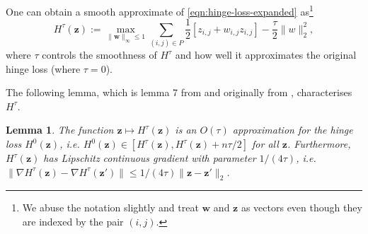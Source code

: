 \documentclass[a4paper, 11pt]{article}
\newtheorem{lemma}{Lemma}
\begin{document}
One can obtain a smooth approximate of \eqref{eqn:hinge-loss-expanded}
as\footnote{We abuse the notation slightly and treat $\bm{w}$ and $\bm{z}$ as
    vectors even though they are indexed by the pair $(i, j)$.}
\begin{equation}
    H^\tau(\bm{z}) := \max_{\lVert \bm{w} \rVert_\infty \le 1} \sum_{(i,j) \in P} \frac12 [z_{i,j} + w_{i,j} z_{i,j}] - \frac{\tau}{2} \lVert w \rVert_2^2,
\end{equation}
where $\tau$ controls the smoothness of $H^\tau$ and how well it approximates
the original hinge loss (where $\tau=0$).

The following lemma, which is lemma 7 from \citet{Dedieu2022} and originally from
\citet{Nesterov2005}, characterises $H^\tau$.
\begin{lemma}\label{lem:smooth-approximation}
    The function $\bm{z} \mapsto H^\tau(\bm{z})$ is an $O(\tau)$ approximation
    for the hinge loss $H^0(\bm{z})$, i.e. $H^0(\bm{z}) \in [H^\tau(\bm{z}),
            H^\tau(\bm{z}) + n\tau / 2]$ for all $\bm{z}$. Furthermore, $H^\tau(\bm{z})$
    has Lipschitz continuous gradient with parameter $1/(4\tau)$, i.e. $\lVert
        \nabla H^\tau(\bm{z}) - \nabla H^\tau(\bm{z'}) \rVert \le 1/(4\tau) \lVert \bm{z} - \bm{z'} \rVert_2$.
\end{lemma}
\end{document}
